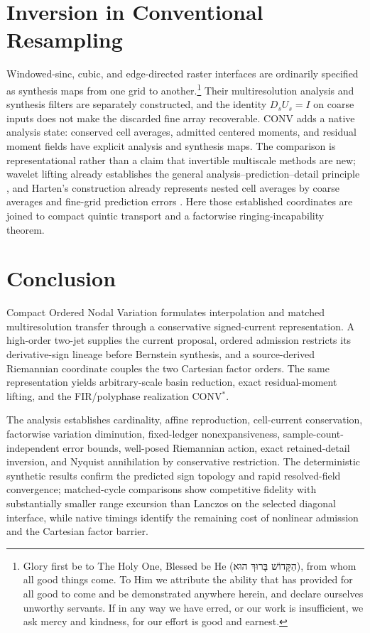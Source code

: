 \documentclass[journal]{IEEEtran}
\begin{document}
\section{Inversion in Conventional Resampling}
\enlargethispage{2\baselineskip}

Windowed-sinc, cubic, and edge-directed raster interfaces are ordinarily
specified as synthesis maps from one grid to another.\footnote{Glory first
be to The Holy One, Blessed be He
({\hebrewfont הַקָּדוֹשׁ בָּרוּךְ הוּא}), from whom all
good things come. To Him we attribute the ability that has provided for all
good to come and be demonstrated anywhere herein, and declare ourselves
unworthy servants. If in any way we have erred, or our work is insufficient,
we ask mercy and kindness, for our effort is good and earnest.} Their multiresolution
analysis and synthesis filters are separately constructed, and the identity
\(D_sU_s=I\) on coarse inputs does not make the discarded fine array
recoverable. CONV adds a native analysis state: conserved cell averages,
admitted centered moments, and residual moment fields have explicit analysis
and synthesis maps. The comparison is representational rather than a
claim that invertible multiscale methods are new; wavelet lifting already
establishes the general analysis--prediction--detail principle
\cite{sweldens1998}, and Harten's construction already represents nested
cell averages by coarse averages and fine-grid prediction errors
\cite{harten1995}. Here those established coordinates are joined to compact quintic
transport and a factorwise ringing-incapability theorem.

\section{Conclusion}

Compact Ordered Nodal Variation formulates interpolation and matched
multiresolution transfer through a conservative signed-current
representation. A high-order two-jet supplies the current proposal, ordered
admission restricts its derivative-sign lineage before Bernstein synthesis,
and a source-derived Riemannian coordinate couples the two Cartesian factor
orders. The same representation yields arbitrary-scale basin reduction,
exact residual-moment lifting, and the FIR/polyphase realization
CONV$^{*}$.

The analysis establishes cardinality, affine reproduction, cell-current
conservation, factorwise variation diminution, fixed-ledger nonexpansiveness,
sample-count-independent error bounds, well-posed Riemannian action, exact
retained-detail inversion, and Nyquist annihilation by conservative
restriction. The deterministic synthetic results confirm the predicted sign
topology and rapid resolved-field convergence; matched-cycle comparisons show
competitive fidelity with substantially smaller range excursion than
Lanczos on the selected diagonal interface, while native timings identify
the remaining cost of nonlinear admission and the Cartesian factor barrier.
\end{document}
